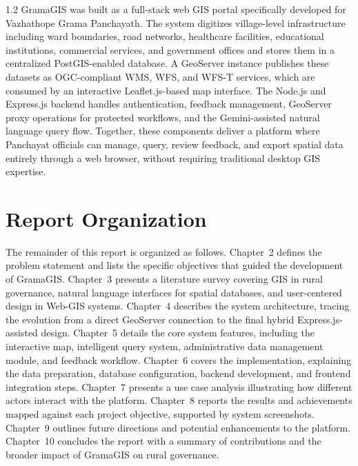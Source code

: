 \begin{spacing}{1.2}
GramaGIS was built as a full-stack web GIS portal specifically developed for Vazhathope Grama Panchayath. The system digitizes village-level infrastructure including ward boundaries, road networks, healthcare facilities, educational institutions, commercial services, and government offices and stores them in a centralized PostGIS-enabled database. A GeoServer instance publishes these datasets as OGC-compliant WMS, WFS, and WFS-T services, which are consumed by an interactive Leaflet.js-based map interface. The Node.js and Express.js backend handles authentication, feedback management, GeoServer proxy operations for protected workflows, and the Gemini-assisted natural language query flow. Together, these components deliver a platform where Panchayat officials can manage, query, review feedback, and export spatial data entirely through a web browser, without requiring traditional desktop GIS expertise.

\section{Report Organization}
The remainder of this report is organized as follows. Chapter~2 defines the problem statement and lists the specific objectives that guided the development of GramaGIS. Chapter~3 presents a literature survey covering GIS in rural governance, natural language interfaces for spatial databases, and user-centered design in Web-GIS systems. Chapter~4 describes the system architecture, tracing the evolution from a direct GeoServer connection to the final hybrid Express.js-assisted design. Chapter~5 details the core system features, including the interactive map, intelligent query system, administrative data management module, and feedback workflow. Chapter~6 covers the implementation, explaining the data preparation, database configuration, backend development, and frontend integration steps. Chapter~7 presents a use case analysis illustrating how different actors interact with the platform. Chapter~8 reports the results and achievements mapped against each project objective, supported by system screenshots. Chapter~9 outlines future directions and potential enhancements to the platform. Chapter~10 concludes the report with a summary of contributions and the broader impact of GramaGIS on rural governance.

\end{spacing}
